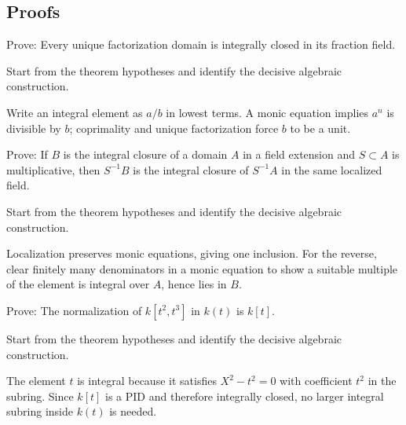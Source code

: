 \subsection*{Proofs}

\begin{exercise}\label{exr:v20-expand-06}
Prove: Every unique factorization domain is integrally closed in its fraction field.
\end{exercise}
\begin{hint}
Start from the theorem hypotheses and identify the decisive algebraic construction.
\end{hint}
\begin{solution}
Write an integral element as $a/b$ in lowest terms. A monic equation implies $a^n$ is divisible by $b$; coprimality and unique factorization force $b$ to be a unit.
\end{solution}

\begin{exercise}\label{exr:v20-expand-07}
Prove: If $B$ is the integral closure of a domain $A$ in a field extension and $S\subset A$ is multiplicative, then $S^{-1}B$ is the integral closure of $S^{-1}A$ in the same localized field.
\end{exercise}
\begin{hint}
Start from the theorem hypotheses and identify the decisive algebraic construction.
\end{hint}
\begin{solution}
Localization preserves monic equations, giving one inclusion. For the reverse, clear finitely many denominators in a monic equation to show a suitable multiple of the element is integral over $A$, hence lies in $B$.
\end{solution}

\begin{exercise}\label{exr:v20-expand-08}
Prove: The normalization of $k[t^2,t^3]$ in $k(t)$ is $k[t]$.
\end{exercise}
\begin{hint}
Start from the theorem hypotheses and identify the decisive algebraic construction.
\end{hint}
\begin{solution}
The element $t$ is integral because it satisfies $X^2-t^2=0$ with coefficient $t^2$ in the subring. Since $k[t]$ is a PID and therefore integrally closed, no larger integral subring inside $k(t)$ is needed.
\end{solution}

